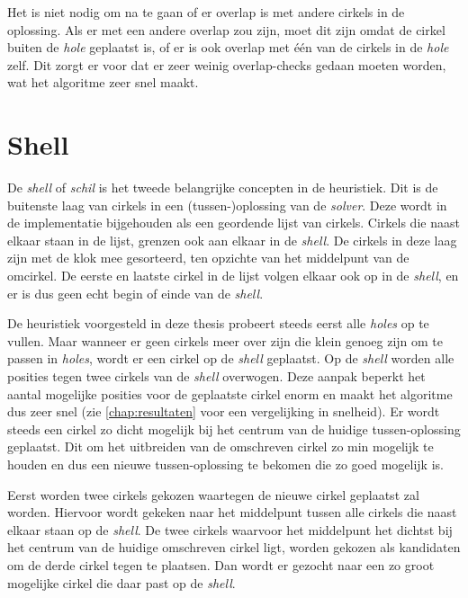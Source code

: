 \documentclass[12pt,a4paper,oneside]{book}
\begin{document}
Het is niet nodig om na te gaan of er overlap is met andere cirkels in de oplossing.
Als er met een andere overlap zou zijn, moet dit zijn omdat de cirkel buiten de \textit{hole} geplaatst is, of er is ook overlap met één van de cirkels in de \textit{hole} zelf.
Dit zorgt er voor dat er zeer weinig overlap-checks gedaan moeten worden, wat het algoritme zeer snel maakt.

\section{Shell} \label{sec:shell}

De \textit{shell} of \textit{schil} is het tweede belangrijke concepten in de heuristiek.
Dit is de buitenste laag van cirkels in een (tussen-)oplossing van de \textit{solver}.
Deze wordt in de implementatie bijgehouden als een geordende lijst van cirkels.
Cirkels die naast elkaar staan in de lijst, grenzen ook aan elkaar in de \textit{shell}.
De cirkels in deze laag zijn met de klok mee gesorteerd, ten opzichte van het middelpunt van de omcirkel.
De eerste en laatste cirkel in de lijst volgen elkaar ook op in de \textit{shell}, en er is dus geen echt begin of einde van de \textit{shell}.

De heuristiek voorgesteld in deze thesis probeert steeds eerst alle \textit{holes} op te vullen.
Maar wanneer er geen cirkels meer over zijn die klein genoeg zijn om te passen in \textit{holes}, wordt er een cirkel op de \textit{shell} geplaatst.
Op de \textit{shell} worden alle posities tegen twee cirkels van de \textit{shell} overwogen.
Deze aanpak beperkt het aantal mogelijke posities voor de geplaatste cirkel enorm en maakt het algoritme dus zeer snel (zie \autoref{chap:resultaten} voor een vergelijking in snelheid).
Er wordt steeds een cirkel zo dicht mogelijk bij het centrum van de huidige tussen-oplossing geplaatst.
Dit om het uitbreiden van de omschreven cirkel zo min mogelijk te houden en dus een nieuwe tussen-oplossing te bekomen die zo goed mogelijk is.

Eerst worden twee cirkels gekozen waartegen de nieuwe cirkel geplaatst zal worden.
Hiervoor wordt gekeken naar het middelpunt tussen alle cirkels die naast elkaar staan op de \textit{shell}.
De twee cirkels waarvoor het middelpunt het dichtst bij het centrum van de huidige omschreven cirkel ligt, worden gekozen als kandidaten om de derde cirkel tegen te plaatsen.
Dan wordt er gezocht naar een zo groot mogelijke cirkel die daar past op de \textit{shell}.
\end{document}

